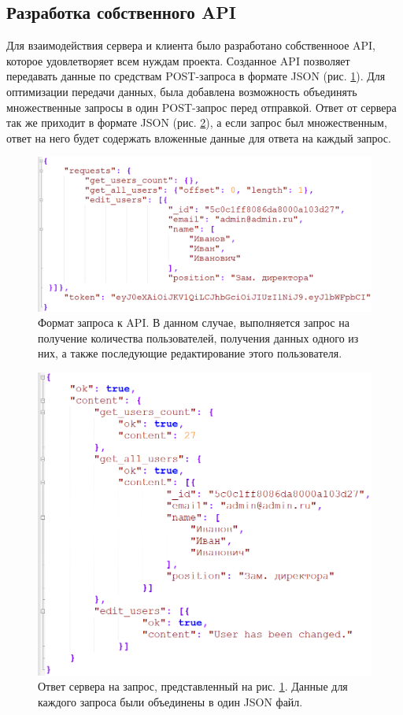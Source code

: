 \clearpage
\subsection{Разработка собственного API}
Для взаимодействия сервера и клиента было разработано собственноое API, которое удовлетворяет всем нуждам проекта.
Созданное API позволяет передавать данные по средствам POST-запроса в формате JSON (рис. \ref{fig:req}).
Для оптимизации передачи данных, была добавлена возможность объединять множественные запросы в один POST-запрос перед отправкой.
Ответ от сервера так же приходит в формате JSON (рис. \ref{fig:ans}), а если запрос был множественным,
ответ на него будет содержать вложенные данные для ответа на каждый запрос.
\begin{figure}[h]
    \centering
    \includegraphics[width=1\linewidth]{img/req.png}
    \caption{Формат запроса к API. В данном случае, выполняется запрос на получение количества пользователей,
    получения данных одного из них, а также последующие редактирование этого пользователя.}
    \label{fig:req}
\end{figure}

\begin{figure}[h]
    \centering
    \includegraphics[width=1\linewidth]{img/ans.png}
    \caption{Ответ сервера на запрос, представленный на рис. \ref{fig:req}. Данные для каждого запроса были объединены в один JSON файл.}
    \label{fig:ans}
\end{figure}


